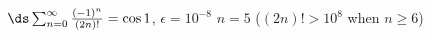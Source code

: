{$\ds \sum_{n=0}^\infty \frac{(-1)^{n}}{(2n)!}=\cos 1$, \quad $\epsilon = 10^{-8}$
}
{$n=5$ ($(2n)!>10^8$ when $n\geq 6$)
}